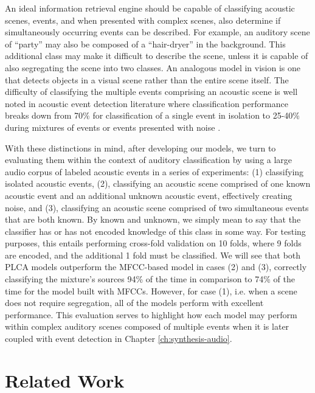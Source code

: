 \documentclass[a4paper,10pt,final]{ThesisStyle}
\begin{document}
An ideal information retrieval engine should be capable of classifying acoustic scenes, events, and when presented with complex scenes, also determine if simultaneously occurring events can be described.  For example, an auditory scene of ``party'' may also be composed of a ``hair-dryer'' in the background.  This additional class may make it difficult to describe the scene, unless it is capable of also segregating the scene into two classes.  An analogous model in vision is one that detects objects in a visual scene rather than the entire scene itself.  The difficulty of classifying the multiple events comprising an acoustic scene is well noted in acoustic event detection literature where classification performance breaks down from 70\% for classification of a single event in isolation to 25-40\% during mixtures of events or events presented with noise \cite{Temko2007}.  

With these distinctions in mind, after developing our models, we turn to evaluating them within the context of auditory classification by using a large audio corpus of labeled acoustic events in a series of experiments: (1) classifying isolated acoustic events, (2), classifying an acoustic scene comprised of one known acoustic event and an additional unknown acoustic event, effectively creating noise, and (3), classifying an acoustic scene comprised of two simultaneous events that are both known.  By known and unknown, we simply mean to say that the classifier has or has not encoded knowledge of this class in some way.  For testing purposes, this entails performing cross-fold validation on 10 folds, where 9 folds are encoded, and the additional 1 fold must be classified.  We will see that both PLCA models outperform the MFCC-based model in cases (2) and (3), correctly classifying the mixture's sources 94\% of the time in comparison to 74\% of the time for the model built with MFCCs.  However, for case (1), i.e. when a scene does not require segregation, all of the models perform with excellent performance.  This evaluation serves to highlight how each model may perform within complex auditory scenes composed of multiple events when it is later coupled with event detection in Chapter \ref{ch:synthesis-audio}.  


\section{Related Work}
\end{document}
